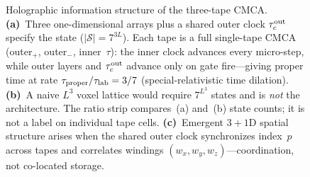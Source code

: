 \begin{figure}[p]
{%
}%
\vspace*{0.15cm}
\caption{Holographic information structure of the three-tape CMCA.
  \textbf{(a)}~Three one-dimensional arrays plus a shared outer clock
  $\tau_c^{\rm out}$ specify the state ($|\mathcal{S}|=7^{3L}$).
  Each tape is a full single-tape CMCA (outer$_{+}$, outer$_{-}$, inner~$\tau$):
  the inner clock advances every micro-step, while outer layers and
  $\tau_c^{\rm out}$ advance only on gate fire---giving proper time at
  rate $\tau_{\rm proper}/\tau_{\rm lab}=3/7$ (special-relativistic time dilation).
  \textbf{(b)}~A naive $L^3$ voxel lattice would require $7^{L^3}$ states and is \emph{not}
  the architecture.
  The ratio strip compares~(a) and~(b) state counts; it is not a label on individual tape cells.
  \textbf{(c)}~Emergent $3{+}1$D spatial structure arises when the shared outer clock
  synchronizes index~$p$ across tapes and correlates windings
  $(w_x,w_y,w_z)$---coordination, not co-located storage.}
\label{fig:holographic_dof}
\end{figure}
